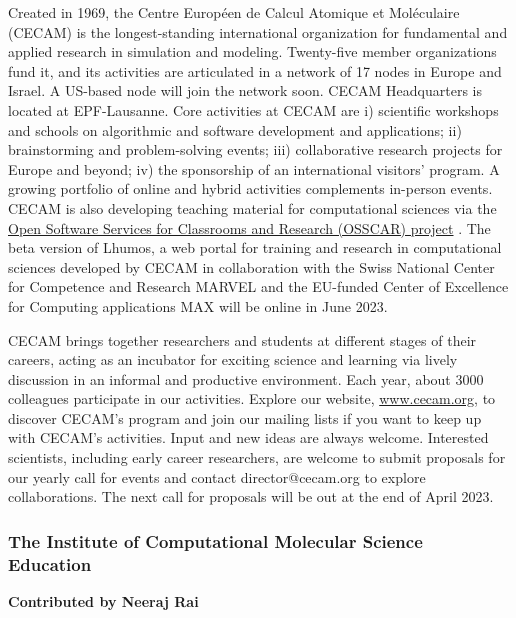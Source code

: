 \documentclass[9pt,review]{livecoms}
\begin{document}
Created in 1969, the Centre Européen de Calcul Atomique et Moléculaire (CECAM) is the longest-standing international organization for fundamental and applied research in simulation and modeling. 
Twenty-five member organizations fund it, and its activities are articulated in a network of 17 nodes in Europe and Israel. 
A US-based node will join the network soon. 
CECAM Headquarters is located at EPF-Lausanne. 
Core activities at CECAM are i) scientific workshops and schools on algorithmic and software development and applications; ii) brainstorming and problem-solving events; iii) collaborative research projects for Europe and beyond; iv) the sponsorship of an international visitors’ program. 
A growing portfolio of online and hybrid activities complements in-person events. 
CECAM is also developing teaching material for computational sciences via the \href{https://www.osscar.org/}{Open Software Services for Classrooms and Research (OSSCAR) project} \cite{DU2023}. 
The beta version of Lhumos, a web portal for training and research in computational sciences developed by CECAM in collaboration with the Swiss National Center for Competence and Research MARVEL and the EU-funded Center of Excellence for Computing applications MAX will be online in June 2023.
 
CECAM brings together researchers and students at different stages of their careers, acting as an incubator for exciting science and learning via lively discussion in an informal and productive environment. 
Each year, about 3000 colleagues participate in our activities. 
Explore our website, \href{https://www.cecam.org/}{www.cecam.org}, to discover CECAM’s program and join our mailing lists if you want to keep up with CECAM’s activities. 
Input and new ideas are always welcome. 
Interested scientists, including early career researchers, are welcome to submit proposals for our yearly call for events and contact director@cecam.org to explore collaborations. 
The next call for proposals will be out at the end of April 2023.


\subsubsection{The Institute of Computational Molecular Science Education}

\textbf{Contributed by Neeraj Rai}
\end{document}
